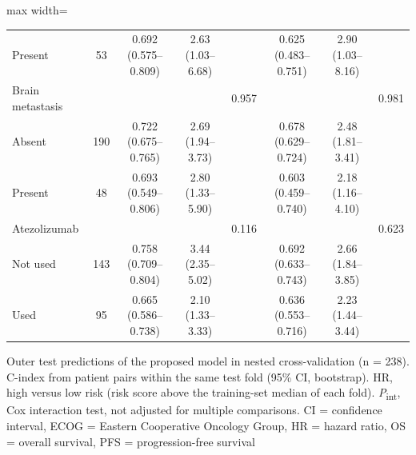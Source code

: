 \documentclass{article}
\begin{document}
\begin{table}[htbp]
\begin{adjustbox}{max width=\textwidth}
\begin{tabular}{@{}lc ccc ccc@{}}
\quad Present & 53 & 0.692 (0.575--0.809) & 2.63 (1.03--6.68) & & 0.625 (0.483--0.751) & 2.90 (1.03--8.16) & \\
Brain metastasis & & & & 0.957 & & & 0.981 \\
\quad Absent & 190 & 0.722 (0.675--0.765) & 2.69 (1.94--3.73) & & 0.678 (0.629--0.724) & 2.48 (1.81--3.41) & \\
\quad Present & 48 & 0.693 (0.549--0.806) & 2.80 (1.33--5.90) & & 0.603 (0.459--0.740) & 2.18 (1.16--4.10) & \\
Atezolizumab & & & & 0.116 & & & 0.623 \\
\quad Not used & 143 & 0.758 (0.709--0.804) & 3.44 (2.35--5.02) & & 0.692 (0.633--0.743) & 2.66 (1.84--3.85) & \\
\quad Used & 95 & 0.665 (0.586--0.738) & 2.10 (1.33--3.33) & & 0.636 (0.553--0.716) & 2.23 (1.44--3.44) & \\
\bottomrule
\end{tabular}%
\end{adjustbox}
\par\smallskip
\begin{minipage}{\textwidth}\footnotesize
Outer test predictions of the proposed model in nested cross-validation (n = 238). C-index from patient pairs within the same test fold (95\% CI, bootstrap). HR, high versus low risk (risk score above the training-set median of each fold). \textit{P}\textsubscript{int}, Cox interaction test, not adjusted for multiple comparisons. CI = confidence interval, ECOG = Eastern Cooperative Oncology Group, HR = hazard ratio, OS = overall survival, PFS = progression-free survival
\end{minipage}
\end{table}
\end{document}
